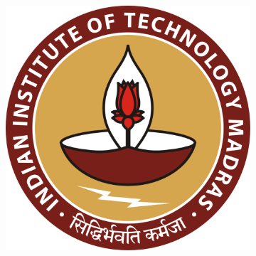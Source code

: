 
\begin{figure}[htpb] %
	\begin{subfigure}{0.5\textwidth}
		\centering
		\includegraphics[width=0.9\linewidth]{iitmlogo.eps}
		\caption{}
		\label{fig:iitma}
	\end{subfigure}%
	\begin{subfigure}{0.5\textwidth}
		\centering

\end{subfigure}
\end{figure}
